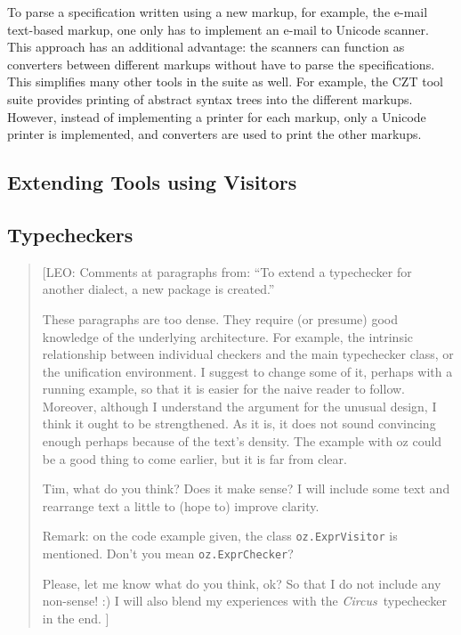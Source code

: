 \documentclass{llncs}
\newcommand{\Circus}{{\sf\slshape Circus}}
\begin{document}
To parse a specification written using a new markup, for example, the
e-mail text-based markup, one only has to implement an e-mail to Unicode
scanner. This approach has an additional advantage: the scanners can function as
converters between different markups without have to parse the
specifications. This simplifies many other tools in the suite as
well. For example, the CZT tool suite provides printing of abstract
syntax trees into the different markups. However, instead of
implementing a printer for each markup, only a Unicode printer is
implemented, and converters are used to print the other markups.

\subsection{Extending Tools using Visitors}
\label{extending-visitors}


\subsection{Typecheckers}

\begin{quotation}
[LEO: Comments at paragraphs from: ``To extend a typechecker for another dialect,
      a new package is created.''

      \vspace{5pt}

      These paragraphs are too dense. They require (or presume) good knowledge of
      the underlying architecture. For example, the intrinsic relationship between
      individual checkers and the main typechecker class, or the unification environment.
      I suggest to change some of it, perhaps with a running example, so that it is easier
      for the naive reader to follow.
      Moreover, although I understand the argument for the unusual design,
      I think it ought to be strengthened. As it is, it does not sound convincing
      enough perhaps because of the text's density. The example with oz could be
      a good thing to come earlier, but it is far from clear.

      \vspace{5pt}

      Tim, what do you think? Does it make sense?
      I will include some text and rearrange text a little to (hope to) improve clarity.

      Remark: on the code example given, the class {\tt oz.ExprVisitor} is mentioned.
      Don't you mean {\tt oz.ExprChecker}?

      Please, let me know what do you think, ok? So that I do not include any non-sense! :)
      I will also blend my experiences with the \Circus\ typechecker in the end.
      ]
\end{quotation}
\end{document}
